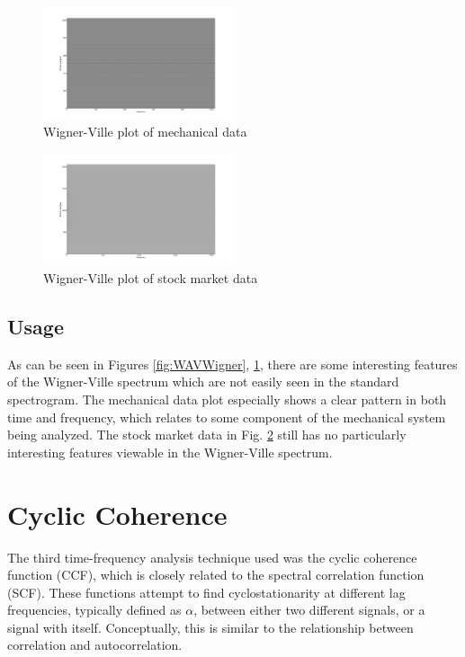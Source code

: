 \documentclass[journal]{IEEEtran}
\begin{document}
\begin{figure}[h!]
\centering
  \includegraphics[width=0.5\textwidth]{matfile_wigner_plot.png}
\caption{Wigner-Ville plot of mechanical data}
\label{fig:MatWigner}
\end{figure}

\begin{figure}[h!]
\centering
  \includegraphics[width=0.5\textwidth]{stock_wigner_plot.png}
\caption{Wigner-Ville plot of stock market data}
\label{fig:StockWigner}
\end{figure}

\subsection{Usage}
As can be seen in Figures \ref{fig:WAVWigner}, \ref{fig:MatWigner}, there are some interesting features of the Wigner-Ville spectrum which
are not easily seen in the standard spectrogram. The mechanical data plot especially shows a clear pattern in both time and frequency, which 
relates to some component of the mechanical system being analyzed. The stock market data in Fig. \ref{fig:StockWigner} still has no particularly 
interesting features viewable in the Wigner-Ville spectrum. 

\section{Cyclic Coherence}
The third time-frequency analysis technique used was the cyclic coherence function (CCF), which is closely related to the spectral correlation function 
(SCF). These functions attempt to find cyclostationarity at different lag frequencies, typically defined as $\alpha$, between either
two different signals, or a signal with itself. Conceptually, this is similar to the relationship between correlation and autocorrelation. 
\end{document}
